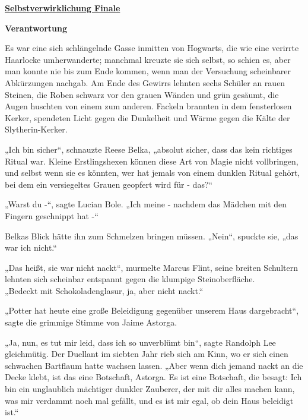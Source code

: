 

\hypertarget{selbstverwirklichung-finale}{%

\textbf{\uline{Selbstverwirklichung Finale}}

\textbf{Verantwortung}

Es war eine sich schlängelnde Gasse inmitten von Hogwarts, die wie eine verirrte Haarlocke umherwanderte; manchmal kreuzte sie sich selbst, so schien es, aber man konnte nie bis zum Ende kommen, wenn man der Versuchung scheinbarer Abkürzungen nachgab. Am Ende des Gewirrs lehnten sechs Schüler an rauen Steinen, die Roben schwarz vor den grauen Wänden und grün gesäumt, die Augen huschten von einem zum anderen. Fackeln brannten in dem fensterlosen Kerker, spendeten Licht gegen die Dunkelheit und Wärme gegen die Kälte der Slytherin-Kerker.

„Ich bin sicher“, schnauzte Reese Belka, „absolut sicher, dass das kein richtiges Ritual war. Kleine Erstlingshexen können diese Art von Magie nicht vollbringen, und selbst wenn sie es könnten, wer hat jemals von einem dunklen Ritual gehört, bei dem ein versiegeltes Grauen geopfert wird für - das?“

„Warst du -“, sagte Lucian Bole. „Ich meine - nachdem das Mädchen mit den Fingern geschnippt hat -“

Belkas Blick hätte ihn zum Schmelzen bringen müssen. „Nein“, spuckte sie, „das war ich nicht.“

„Das heißt, sie war nicht nackt“, murmelte Marcus Flint, seine breiten Schultern lehnten sich scheinbar entspannt gegen die klumpige Steinoberfläche.\\ „Bedeckt mit Schokoladenglasur, ja, aber nicht nackt.“

„Potter hat heute eine große Beleidigung gegenüber unserem Haus dargebracht“, sagte die grimmige Stimme von Jaime Astorga.

„Ja, nun, es tut mir leid, dass ich so unverblümt bin“, sagte Randolph Lee gleichmütig. Der Duellant im siebten Jahr rieb sich am Kinn, wo er sich einen schwachen Bartflaum hatte wachsen lassen. „Aber wenn dich jemand nackt an die Decke klebt, ist das eine Botschaft, Astorga. Es ist eine Botschaft, die besagt: Ich bin ein unglaublich mächtiger dunkler Zauberer, der mit dir alles machen kann, was mir verdammt noch mal gefällt, und es ist mir egal, ob dein Haus beleidigt ist.“

}
